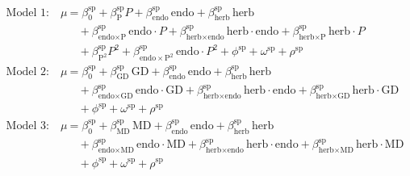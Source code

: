 \documentclass[12pt]{article}\usepackage[]{graphicx}\usepackage[dvipsnames]{xcolor}
\begin{document}
\begin{equation}\label{eq:candidates}
\begin{aligned}
\text{Model 1:} \quad 
\mu &= \beta_{0}^{\text{sp}} + \beta_{\text{P}}^{\text{sp}} P + \beta_{\text{endo}}^{\text{sp}}\,\text{endo} + \beta_{\text{herb}}^{\text{sp}}\,\text{herb} \\
&\quad + \beta_{\text{endo} \times \text{P}}^{\text{sp}}\,\text{endo} \cdot P 
+ \beta_{\text{herb} \times \text{endo}}^{\text{sp}}\,\text{herb} \cdot \text{endo} 
+ \beta_{\text{herb} \times \text{P}}^{\text{sp}}\,\text{herb} \cdot P \\
&\quad + \beta_{\text{P}^2}^{\text{sp}} P^2 + \beta_{\text{endo} \times \text{P}^2}^{\text{sp}}\,\text{endo} \cdot P^2 
+ \phi^{\text{sp}} + \omega^{\text{sp}} + \rho^{\text{sp}} \\
\text{Model 2:} \quad 
\mu &= \beta_{0}^{\text{sp}} + \beta_{\text{GD}}^{\text{sp}}\,\text{GD} + \beta_{\text{endo}}^{\text{sp}}\,\text{endo} + \beta_{\text{herb}}^{\text{sp}}\,\text{herb} \\
&\quad + \beta_{\text{endo} \times \text{GD}}^{\text{sp}}\,\text{endo} \cdot \text{GD} 
+ \beta_{\text{herb} \times \text{endo}}^{\text{sp}}\,\text{herb} \cdot \text{endo} 
+ \beta_{\text{herb} \times \text{GD}}^{\text{sp}}\,\text{herb} \cdot \text{GD} \\
&\quad + \phi^{\text{sp}} + \omega^{\text{sp}} + \rho^{\text{sp}} \\
\text{Model 3:} \quad 
\mu &= \beta_{0}^{\text{sp}} + \beta_{\text{MD}}^{\text{sp}}\,\text{MD} + \beta_{\text{endo}}^{\text{sp}}\,\text{endo} + \beta_{\text{herb}}^{\text{sp}}\,\text{herb} \\
&\quad + \beta_{\text{endo} \times \text{MD}}^{\text{sp}}\,\text{endo} \cdot \text{MD} 
+ \beta_{\text{herb} \times \text{endo}}^{\text{sp}}\,\text{herb} \cdot \text{endo} 
+ \beta_{\text{herb} \times \text{MD}}^{\text{sp}}\,\text{herb} \cdot \text{MD} \\
&\quad + \phi^{\text{sp}} + \omega^{\text{sp}} + \rho^{\text{sp}}
\end{aligned}
\end{equation}
\end{document}
